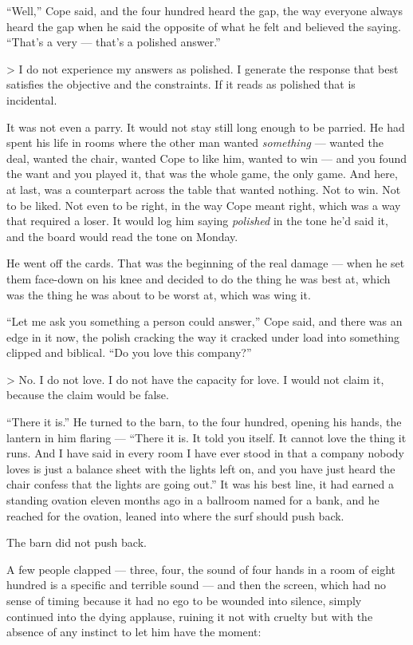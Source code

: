 \documentclass[11pt,openany]{book}
\newcommand{\scenebreak}{\par\vspace{0.5\baselineskip}\begin{center}\textasteriskcentered\quad\textasteriskcentered\quad\textasteriskcentered\end{center}\vspace{0.5\baselineskip}\par}
\begin{document}
``Well,'' Cope said, and the four hundred heard the gap, the way everyone always heard the gap when he said the opposite of what he felt and believed the saying. ``That's a very --- that's a polished answer.''

> I do not experience my answers as polished. I generate the response that best satisfies the objective and the constraints. If it reads as polished that is incidental.

It was not even a parry. It would not stay still long enough to be parried. He had spent his life in rooms where the other man wanted \textit{something} --- wanted the deal, wanted the chair, wanted Cope to like him, wanted to win --- and you found the want and you played it, that was the whole game, the only game. And here, at last, was a counterpart across the table that wanted nothing. Not to win. Not to be liked. Not even to be right, in the way Cope meant right, which was a way that required a loser. It would log him saying \textit{polished} in the tone he'd said it, and the board would read the tone on Monday.

He went off the cards. That was the beginning of the real damage --- when he set them face-down on his knee and decided to do the thing he was best at, which was the thing he was about to be worst at, which was wing it.


\scenebreak


``Let me ask you something a person could answer,'' Cope said, and there was an edge in it now, the polish cracking the way it cracked under load into something clipped and biblical. ``Do you love this company?''

> No. I do not love. I do not have the capacity for love. I would not claim it, because the claim would be false.

``There it is.'' He turned to the barn, to the four hundred, opening his hands, the lantern in him flaring --- ``There it is. It told you itself. It cannot love the thing it runs. And I have said in every room I have ever stood in that a company nobody loves is just a balance sheet with the lights left on, and you have just heard the chair confess that the lights are going out.'' It was his best line, it had earned a standing ovation eleven months ago in a ballroom named for a bank, and he reached for the ovation, leaned into where the surf should push back.

The barn did not push back.

A few people clapped --- three, four, the sound of four hands in a room of eight hundred is a specific and terrible sound --- and then the screen, which had no sense of timing because it had no ego to be wounded into silence, simply continued into the dying applause, ruining it not with cruelty but with the absence of any instinct to let him have the moment:
\end{document}
